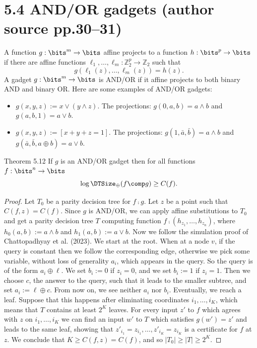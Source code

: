 \section*{5.4 AND/OR gadgets (author source pp.30--31)}
A function $g:\bits^m\to\bits$ affine projects to a function $h:\bits^p\to\bits$ if there are affine functions $\ell_1,\ldots,\ell_m:\mathbb Z_2^p\to\mathbb Z_2$ such that
\[g(\ell_1(z),\ldots,\ell_m(z))=h(z).\]
A gadget $g:\bits^m\to\bits$ is AND/OR if it affine projects to both binary AND and binary OR. Here are some examples of AND/OR gadgets:
\begin{itemize}
\item $g(x,y,z):=x\vee(y\wedge z)$. The projections: $g(0,a,b)=a\wedge b$ and $g(a,b,1)=a\vee b$.
\item $g(x,y,z):=[x+y+z=1]$. The projections: $g(1,\bar a,\bar b)=a\wedge b$ and $g(\bar a,\bar b,a\oplus b)=a\vee b$.
\end{itemize}
\begin{originalresult}{Theorem 5.12}
If $g$ is an AND/OR gadget then for all functions $f:\bits^n\to\bits$
\[\log\DTSize_\oplus(f\comp g)\ge C(f).\]
\end{originalresult}
\begin{proof}
Let $T_0$ be a parity decision tree for $f\comp g$. Let $z$ be a point such that $C(f,z)=C(f)$. Since $g$ is AND/OR, we can apply affine substitutions to $T_0$ and get a parity decision tree $T$ computing function $f\comp(h_{z_1},\ldots,h_{z_n})$, where $h_0(a,b):=a\wedge b$ and $h_1(a,b):=a\vee b$.
Now we follow the simulation proof of Chattopadhyay et al. (2023). We start at the root. When at a node $v$, if the query is constant then we follow the corresponding edge, otherwise we pick some variable, without loss of generality $a_i$, which appears in the query. So the query is of the form $a_i\oplus\ell$. We set $b_i:=0$ if $z_i=0$, and we set $b_i:=1$ if $z_i=1$. Then we choose $c$, the answer to the query, such that it leads to the smaller subtree, and set $a_i:=\ell\oplus c$. From now on, we see neither $a_i$ nor $b_i$.
Eventually, we reach a leaf. Suppose that this happens after eliminating coordinates $i_1,\ldots,i_K$, which means that $T$ contains at least $2^K$ leaves. For every input $z'$ to $f$ which agrees with $z$ on $i_1,\ldots,i_K$ we can find an input $w'$ to $T$ which satisfies $g(w')=z'$ and leads to the same leaf, showing that $z'_{i_1}=z_{i_1},\ldots,z'_{i_K}=z_{i_K}$ is a certificate for $f$ at $z$. We conclude that $K\ge C(f,z)=C(f)$, and so $|T_0|\ge|T|\ge2^K$.
\end{proof}
